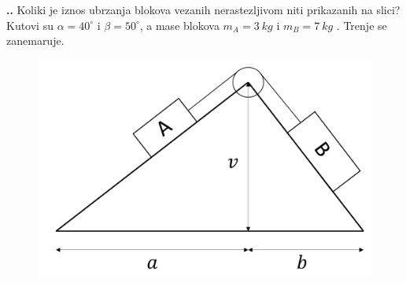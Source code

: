 
\noindent 
\textbf{
\thecjelina.\thezadatak.}
Koliki je iznos ubrzanja blokova vezanih nerastezljivom niti prikazanih na slici? Kutovi su 
$\alpha=40^\circ $  i $\beta=50^\circ $, a mase blokova $m_A=3\ kg$ i $m_B=7\ kg$ . Trenje se zanemaruje.

\begin{figure}[ht]%
  \begin{center}
    \includegraphics[scale=0.20]{03_Dinamika_materijalne_tocke/kosina_5_3.png}
  \end{center}
\end{figure}

